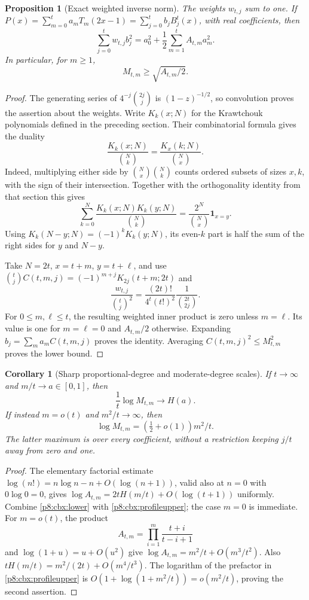 \documentclass[11pt,a4paper]{article}
\newtheorem{proposition}[theorem]{Proposition}
\newtheorem{corollary}[theorem]{Corollary}
\theoremstyle{definition}
\theoremstyle{remark}
\numberwithin{equation}{section}
\begin{document}
\begin{proposition}[Exact weighted inverse norm]\label{p8:cbx:parseval}
The weights $w_{t,j}$ sum to one. If
$P(x)=\sum_{m=0}^t a_mT_m(2x-1)=\sum_{j=0}^t b_jB_j^t(x)$, with
real coefficients, then
\[
 \sum_{j=0}^t w_{t,j}b_j^2
       =a_0^2+\frac12\sum_{m=1}^t A_{t,m}a_m^2.
\]
In particular, for $m\ge1$,
\begin{equation}\label{p8:cbx:lower}
                      M_{t,m}\ge\sqrt{A_{t,m}/2}.
\end{equation}
\end{proposition}
\begin{proof}
The generating series of $4^{-j}\binom{2j}{j}$ is
$(1-z)^{-1/2}$, so convolution proves the assertion about the weights.
Write $K_k(x;N)$ for the Krawtchouk polynomials defined in the preceding
section. Their combinatorial formula gives the duality
\[
 \frac{K_k(x;N)}{\binom Nk}=
 \frac{K_x(k;N)}{\binom Nx}.
\]
Indeed, multiplying either side by $\binom Nx\binom Nk$ counts
ordered subsets of sizes $x,k$, with the sign of their intersection.
Together with the orthogonality identity from that section this gives
\[
 \sum_{k=0}^N\frac{K_k(x;N)K_k(y;N)}{\binom Nk}
                   =\frac{2^N}{\binom Nx}\mathbf1_{x=y}.
\]
Using $K_k(N-y;N)=(-1)^kK_k(y;N)$, its even-$k$ part is half the
sum of the right sides for $y$ and $N-y$.

Take $N=2t$, $x=t+m$, $y=t+\ell$, and use
$\binom tjC(t,m,j)=(-1)^{m+j}K_{2j}(t+m;2t)$ and
\[
 \frac{w_{t,j}}{\binom tj^2}
      =\frac{(2t)!}{4^t(t!)^2}\frac1{\binom{2t}{2j}}.
\]
For $0\le m,\ell\le t$, the resulting weighted inner product is
zero unless $m=\ell$. Its value is one for $m=\ell=0$ and
$A_{t,m}/2$ otherwise. Expanding $b_j=\sum_m a_mC(t,m,j)$ proves
the identity. Averaging $C(t,m,j)^2\le M_{t,m}^2$ proves the lower bound.
\end{proof}

\begin{corollary}[Sharp proportional-degree and moderate-degree scales]
\label{p8:cbx:asymptotic}
If $t\to\infty$ and $m/t\to a\in[0,1]$, then
\[
                    \frac1t\log M_{t,m}\longrightarrow H(a).
\]
If instead $m=o(t)$ and $m^2/t\to\infty$, then
\[
                    \log M_{t,m}=(\tfrac12+o(1))m^2/t.
\]
The latter maximum is over every coefficient, without a restriction
keeping $j/t$ away from zero and one.
\end{corollary}
\begin{proof}
The elementary factorial estimate
$\log(n!)=n\log n-n+O(\log(n+1))$, valid also at $n=0$ with
$0\log0=0$, gives
$\log A_{t,m}=2tH(m/t)+O(\log(t+1))$ uniformly.
Combine \eqref{p8:cbx:lower} with \eqref{p8:cbx:profileupper}; the case
$m=0$ is immediate. For $m=o(t)$, the product
\[
 A_{t,m}=\prod_{i=1}^m\frac{t+i}{t-i+1}
\]
and $\log(1+u)=u+O(u^2)$ give
$\log A_{t,m}=m^2/t+O(m^3/t^2)$.
Also $tH(m/t)=m^2/(2t)+O(m^4/t^3)$.
The logarithm of the prefactor in \eqref{p8:cbx:profileupper} is
$O(1+\log(1+m^2/t))=o(m^2/t)$, proving the second assertion.
\end{proof}
\end{document}
